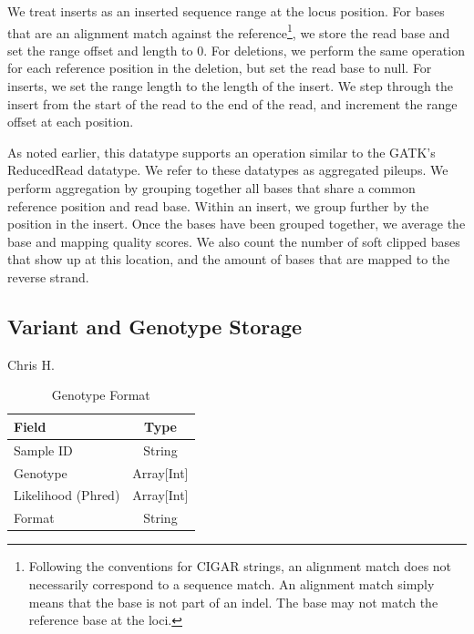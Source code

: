 \documentclass[10pt,twocolumn]{article}
\theoremstyle{plain}
\begin{document}
We treat inserts as an inserted sequence range at the locus position. For bases that are an alignment match against the
reference\footnote{Following the conventions for CIGAR strings, an alignment match does not necessarily correspond to
a sequence match. An alignment match simply means that the base is not part of an indel. The base may not match the
reference base at the loci.}, we store the read base and set the range offset and length to 0. For deletions, we perform the
same operation for each reference position in the deletion, but set the read base to null. For inserts, we set the range length
to the length of the insert. We step through the insert from the start of the read to the end of the read, and increment the
range offset at each position.

As noted earlier, this datatype supports an operation similar to the GATK's ReducedRead datatype. We refer to these datatypes
as aggregated pileups. We perform aggregation by grouping together all bases that share a common reference position and
read base. Within an insert, we group further by the position in the insert. Once the bases have been grouped together, we average
the base and mapping quality scores. We also count the number of soft clipped bases that show up at this location, and the amount
of bases that are mapped to the reverse strand.

\subsection{Variant and Genotype Storage}
\label{sec:variant-and-genotype-storage}

Chris H.

\begin{table}[h]
\caption{Genotype Format}
\label{tab:genotype-format}
\begin{center}
\begin{tabular}{| l | c |}
\hline
\bf Field & \bf Type \\
\hline
Sample ID & String \\
Genotype & Array[Int] \\
Likelihood (Phred) & Array[Int] \\
Format & String \\
\hline
\end{tabular}
\end{center}
\end{table}
\end{document}
